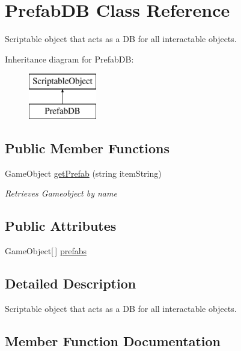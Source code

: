 \hypertarget{class_prefab_d_b}{}\section{Prefab\+DB Class Reference}
\label{class_prefab_d_b}


Scriptable object that acts as a DB for all interactable objects.  


Inheritance diagram for Prefab\+DB\+:\begin{figure}[H]
\begin{center}
\leavevmode
\includegraphics[height=2.000000cm]{class_prefab_d_b}
\end{center}
\end{figure}
\subsection*{Public Member Functions}
\begin{DoxyCompactItemize}
\item 
Game\+Object \hyperlink{class_prefab_d_b_a694392b19a1ed949b1d40ae511a074db}{get\+Prefab} (string item\+String)
\begin{DoxyCompactList}\small\item\em Retrieves Gameobject by name \end{DoxyCompactList}\end{DoxyCompactItemize}
\subsection*{Public Attributes}
\begin{DoxyCompactItemize}
\item 
Game\+Object\mbox{[}$\,$\mbox{]} \hyperlink{class_prefab_d_b_a68bccd8eb2fe77dd4963a8d8cbb60294}{prefabs}
\end{DoxyCompactItemize}


\subsection{Detailed Description}
Scriptable object that acts as a DB for all interactable objects. 



\subsection{Member Function Documentation}
